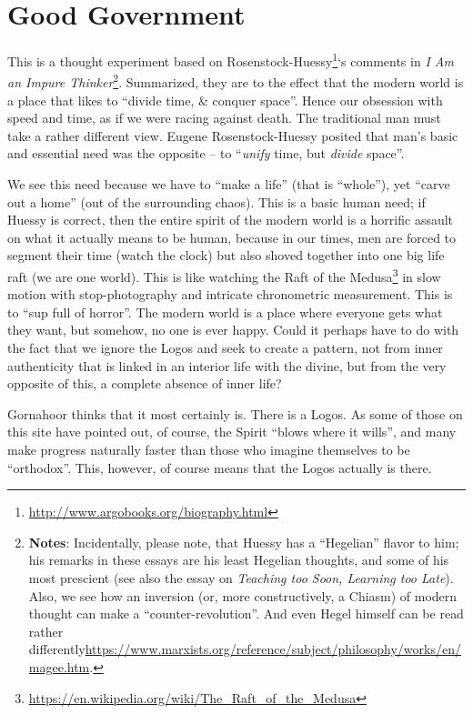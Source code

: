\section{Good Government}

This is a thought experiment based on Rosenstock-Huessy\footnote{\url{http://www.argobooks.org/biography.html}}`s comments in \emph{I Am an Impure Thinker}\footnote{\textbf{Notes}: Incidentally, please note, that Huessy has a ``Hegelian'' flavor to him; his remarks in these essays are his least Hegelian thoughts, and some of his most prescient (see also the essay on \emph{Teaching too Soon, Learning too Late}). Also, we see how an inversion (or, more constructively, a Chiasm) of modern thought can make a ``counter-revolution''. And even Hegel himself can be read rather differently\url{https://www.marxists.org/reference/subject/philosophy/works/en/magee.htm}.}. Summarized, they are to the effect that the modern world is a place that likes to ``divide time, \& conquer space''. Hence our obsession with speed and time, as if we were racing against death. The traditional man must take a rather different view. Eugene Rosenstock-Huessy posited that man's basic and essential need was the opposite -- to ``\emph{unify} time, but \emph{divide} space''.

We see this need because we have to ``make a life'' (that is ``whole''), yet ``carve out a home'' (out of the surrounding chaos). This is a basic human need; if Huessy is correct, then the entire spirit of the modern world is a horrific assault on what it actually means to be human, because in our times, men are forced to segment their time (watch the clock) but also shoved together into one big life raft (we are one world). This is like watching the Raft of the Medusa\footnote{\url{https://en.wikipedia.org/wiki/The\_Raft\_of\_the\_Medusa}} in slow motion with stop-photography and intricate chronometric measurement. This is to ``sup full of horror''. The modern world is a place where everyone gets what they want, but somehow, no one is ever happy. Could it perhaps have to do with the fact that we ignore the Logos and seek to create a pattern, not from inner authenticity that is linked in an interior life with the divine, but from the very opposite of this, a complete absence of inner life?

Gornahoor thinks that it most certainly is. There is a Logos. As some of those on this site have pointed out, of course, the Spirit ``blows where it wills'', and many make progress naturally faster than those who imagine themselves to be ``orthodox''. This, however, of course means that the Logos actually is there.

